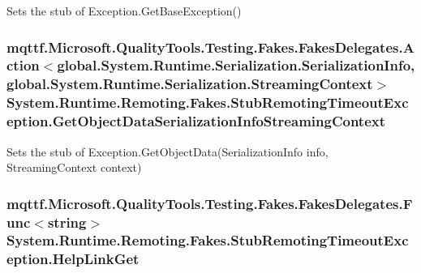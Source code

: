 Sets the stub of Exception.\-Get\-Base\-Exception()

\hypertarget{class_system_1_1_runtime_1_1_remoting_1_1_fakes_1_1_stub_remoting_timeout_exception_ac1119b6b2c76caff5c1820ebf37dc62c}{
\subsubsection[{Get\-Object\-Data\-Serialization\-Info\-Streaming\-Context}]{\setlength{\rightskip}{0pt plus 5cm}mqttf.\-Microsoft.\-Quality\-Tools.\-Testing.\-Fakes.\-Fakes\-Delegates.\-Action$<$global.\-System.\-Runtime.\-Serialization.\-Serialization\-Info, global.\-System.\-Runtime.\-Serialization.\-Streaming\-Context$>$ System.\-Runtime.\-Remoting.\-Fakes.\-Stub\-Remoting\-Timeout\-Exception.\-Get\-Object\-Data\-Serialization\-Info\-Streaming\-Context}}\label{class_system_1_1_runtime_1_1_remoting_1_1_fakes_1_1_stub_remoting_timeout_exception_ac1119b6b2c76caff5c1820ebf37dc62c}


Sets the stub of Exception.\-Get\-Object\-Data(\-Serialization\-Info info, Streaming\-Context context)

\hypertarget{class_system_1_1_runtime_1_1_remoting_1_1_fakes_1_1_stub_remoting_timeout_exception_a44150b9e56908e803477eed91120c2e9}{
\subsubsection[{Help\-Link\-Get}]{\setlength{\rightskip}{0pt plus 5cm}mqttf.\-Microsoft.\-Quality\-Tools.\-Testing.\-Fakes.\-Fakes\-Delegates.\-Func$<$string$>$ System.\-Runtime.\-Remoting.\-Fakes.\-Stub\-Remoting\-Timeout\-Exception.\-Help\-Link\-Get}}\label{class_system_1_1_runtime_1_1_remoting_1_1_fakes_1_1_stub_remoting_timeout_exception_a44150b9e56908e803477eed91120c2e9}


